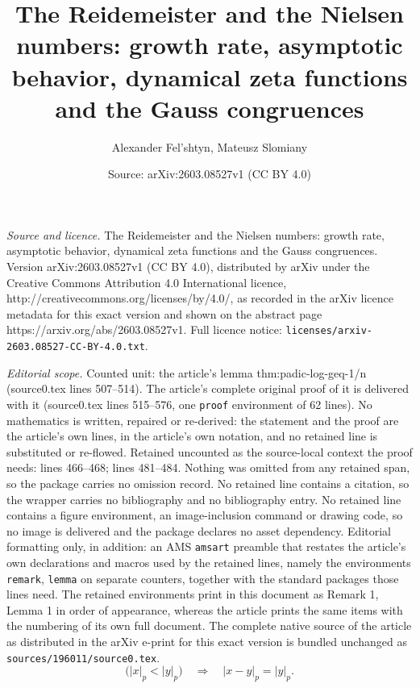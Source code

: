 \documentclass[10pt,a4paper]{amsart}
\title{The Reidemeister and the Nielsen numbers: growth rate, asymptotic behavior, dynamical zeta functions and the Gauss congruences}
\author{Alexander Fel'shtyn, Mateusz Slomiany}
\date{Source: arXiv:2603.08527v1 (CC BY 4.0)}
\begin{document}
\maketitle

\noindent\emph{Source and licence.} The Reidemeister and the Nielsen numbers: growth rate, asymptotic behavior, dynamical zeta functions and the Gauss congruences. Version arXiv:2603.08527v1 (CC BY 4.0), distributed by arXiv under the Creative Commons Attribution 4.0 International licence, http://creativecommons.org/licenses/by/4.0/, as recorded in the arXiv licence metadata for this exact version and shown on the abstract page https://arxiv.org/abs/2603.08527v1. Full licence notice: \texttt{licenses/arxiv-2603.08527-CC-BY-4.0.txt}.\par\smallskip

\noindent\textit{Editorial scope.} Counted unit: the article's lemma thm:padic-log-geq-1/n (source0.tex lines 507--514). The article's complete original proof of it is delivered with it (source0.tex lines 515--576, one \texttt{proof} environment of 62 lines). No mathematics is written, repaired or re-derived: the statement and the proof are the article's own lines, in the article's own notation, and no retained line is substituted or re-flowed.  Retained uncounted as the source-local context the proof needs: lines 466--468; lines 481--484.  Nothing was omitted from any retained span, so the package carries no omission record.  No retained line contains a citation, so the wrapper carries no bibliography and no bibliography entry.  No retained line contains a figure environment, an image-inclusion command or drawing code, so no image is delivered and the package declares no asset dependency.  Editorial formatting only, in addition: an AMS \texttt{amsart} preamble that restates the article's own declarations and macros used by the retained lines, namely the environments \texttt{remark}, \texttt{lemma} on separate counters, together with the standard packages those lines need.  The retained environments print in this document as Remark 1, Lemma 1 in order of appearance, whereas the article prints the same items with the numbering of its own full document.  The complete native source of the article as distributed in the arXiv e-print for this exact version is bundled unchanged as \texttt{sources/196011/source0.tex}.
\begin{equation}\label{eq:padic-triangle}
  \big( |x|_p < |y|_p \big) \quad \Longrightarrow \quad |x-y|_p = |y|_p.
\end{equation}
\end{document}
